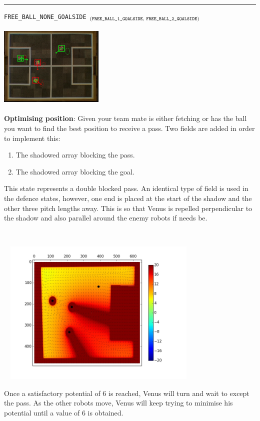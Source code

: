\documentclass[a4paper,12pt]{article}
\begin{document}
\begin{minipage}{\linewidth}
\rule{\textwidth}{1pt}
\texttt{FREE\_BALL\_NONE\_GOALSIDE} $_{\text{(\texttt{FREE\_BALL\_1\_GOALSIDE}, \texttt{FREE\_BALL\_2\_GOALSIDE})}}$\medskip

\begin{minipage}{0.5\textwidth}
\begin{center}
\includegraphics[height=40mm,width=50mm]{v4.jpg}\medskip
\end{center}

\textbf{Optimising position}: Given your team mate is either fetching or has the ball you want to find the best position to receive a pass. Two fields are added in order to implement this: \begin{enumerate} \item The shadowed array blocking the pass. \item The shadowed array blocking the goal. \end{enumerate} This state represents a double blocked pass. An identical type of field is used in the defence states, however, one end is placed at the start of the shadow and the other three pitch lengths away. This is so that Venus is repelled perpendicular to the shadow and also parallel around the enemy robots if needs be.
\end{minipage}
~
\begin{minipage}{0.5\textwidth}
\includegraphics[height=70mm,width=100mm,trim=65 55 65 35,clip]{p4.jpg}\medskip

Once a satisfactory potential of 6 is reached, Venus will turn and wait to except the pass. As the other robots move, Venus will keep trying to minimise his potential until a value of 6 is obtained.
\end{minipage}
\end{minipage}\medskip
\end{document}
